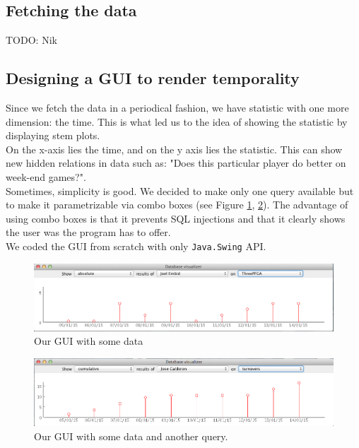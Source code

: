 \documentclass[paper=A4, fontsize=11pt]{scrartcl} %
\begin{document}
\subsection{Fetching the data}
TODO: Nik

\subsection{Designing a GUI to render temporality}
Since we fetch the data in a periodical fashion, we have statistic with one more dimension: the time. This is what led us to the idea of showing the statistic by displaying stem plots.\\

On the x-axis lies the time, and on the y axis lies the statistic. This can show new hidden relations in data such as: "Does this particular player do better on week-end games?".\\

Sometimes, simplicity is good. We decided to make only one query available but to make it parametrizable via combo boxes (see Figure \ref{sc1}, \ref{sc2}). The advantage of using combo boxes is that it prevents SQL injections  and that it clearly shows the user was the program has to offer.\\

We coded the GUI from scratch with only \verb!Java.Swing! API.

\begin{figure}[h]
\includegraphics[scale=0.4]{sc1.png}
\centering
\caption{Our GUI with some data}
\label{sc1}
\end{figure}

\begin{figure}[h]
\includegraphics[scale=0.4]{sc2.png}
\centering
\caption{Our GUI with some data and another query.}
\label{sc2}
\end{figure}
\end{document}
